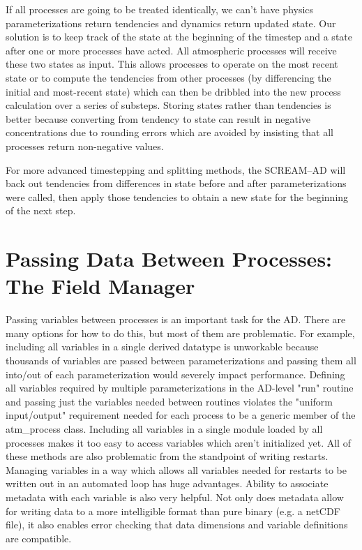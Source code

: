 \documentclass[10pt]{article}
\begin{document}
If all processes are going to be treated identically, we can't have physics parameterizations return tendencies and dynamics return updated state. Our solution is to keep track of the state at the beginning of the timestep and a state after one or more processes have acted. All atmospheric processes will receive these two states as input. This allows processes to operate on the most recent state or to compute the tendencies from other processes (by differencing the initial and most-recent state) which can then be dribbled into the new process calculation over a series of substeps. Storing states rather than tendencies is better because converting from tendency to state can result in negative concentrations due to rounding errors which are avoided by insisting that all processes return non-negative values. 

For more advanced timestepping and splitting methods, the SCREAM--AD will back out tendencies from differences in state before and after parameterizations were called, then apply those tendencies to obtain a new state for the beginning of the next step.  

\section{Passing Data Between Processes: The Field Manager}
\label{sec:FM}

Passing variables between processes is an important task for the AD. There are many options for how to do this, but most of them are problematic. For example, including all variables in a single derived datatype is unworkable because thousands of variables are passed between parameterizations and passing them all into/out of each parameterization would severely impact performance. Defining all variables required by multiple parameterizations in the AD-level "run" routine and passing just the variables needed between routines violates the "uniform input/output" requirement needed for each process to be a generic member of the atm\_process class. Including all variables in a single module loaded by all processes makes it too easy to access variables which aren't initialized yet. All of these methods are also problematic from the standpoint of writing restarts. Managing variables in a way which allows all variables needed for restarts to be written out in an automated loop has huge advantages. Ability to associate metadata with each variable is also very helpful. Not only does metadata allow for writing data to a more intelligible format than pure binary (e.g. a netCDF file), it also enables error checking that data dimensions and variable definitions are compatible.
\end{document}
